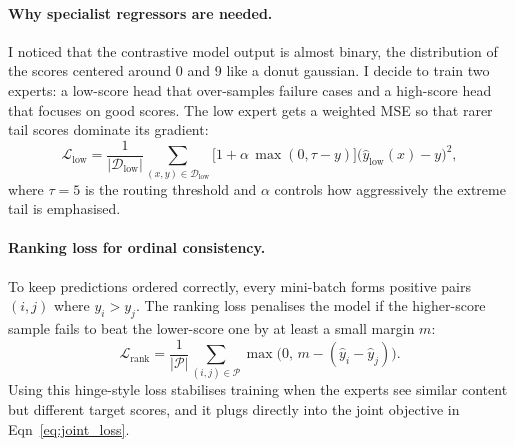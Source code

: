 \documentclass[11pt]{article}
\begin{document}
\paragraph{Why specialist regressors are needed.}
I noticed that the contrastive model output is almost binary, the distribution of the scores centered around 0 and 9 like a donut gaussian. I decide to train two experts: a low-score head that over-samples failure cases and a high-score head that focuses on good scores. The low expert gets a weighted MSE so that rarer tail scores dominate its gradient:
\begin{equation}
\label{eq:low_weighted_mse}
\mathcal{L}_{\text{low}} = \frac{1}{|\mathcal{D}_{\text{low}}|}\sum_{(x,y)\in\mathcal{D}_{\text{low}}} \bigl[1 + \alpha\,\max(0, \tau - y)\bigr]\bigl(\hat{y}_{\text{low}}(x) - y\bigr)^2,
\end{equation}
where \(\tau=5\) is the routing threshold and \(\alpha\) controls how aggressively the extreme tail is emphasised.

\paragraph{Ranking loss for ordinal consistency.}
To keep predictions ordered correctly, every mini-batch forms positive pairs \((i,j)\) where \(y_i > y_j\). The ranking loss penalises the model if the higher-score sample fails to beat the lower-score one by at least a small margin \(m\):
\begin{equation}
\label{eq:ranking_loss}
\mathcal{L}_{\text{rank}} = \frac{1}{|\mathcal{P}|}\sum_{(i,j)\in\mathcal{P}} \max\bigl(0,\, m - (\hat{y}_i - \hat{y}_j)\bigr).
\end{equation}
Using this hinge-style loss stabilises training when the experts see similar content but different target scores, and it plugs directly into the joint objective in Eqn~\ref{eq:joint_loss}.
\end{document}
